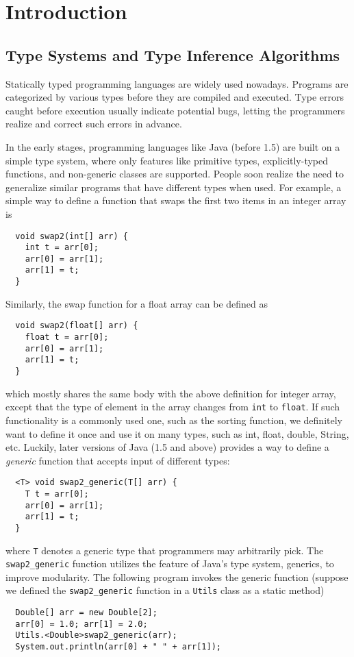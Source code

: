 \chapter{Introduction}


\section{Type Systems and Type Inference Algorithms}

Statically typed programming languages are widely used nowadays.
Programs are categorized by various types before they are compiled and executed.
Type errors caught before execution usually indicate potential bugs,
letting the programmers realize and correct such errors in advance.

In the early stages, programming languages like Java (before 1.5)
are built on a simple type system,
where only features like
primitive types, explicitly-typed functions,
and non-generic classes are supported.
People soon realize the need to generalize similar programs
that have different types when used.
For example, a simple way to define a function that swaps
the first two items in an integer array is
\begin{verbatim}
  void swap2(int[] arr) {
    int t = arr[0];
    arr[0] = arr[1];
    arr[1] = t;
  }
\end{verbatim}
Similarly, the swap function for a float array can be defined as
\begin{verbatim}
  void swap2(float[] arr) {
    float t = arr[0];
    arr[0] = arr[1];
    arr[1] = t;
  }
\end{verbatim}
which mostly shares the same body with the above definition for integer array,
except that the type of element in the array changes from \verb|int| to \verb|float|.
If such functionality is a commonly used one,
such as the sorting function,
we definitely want to define it once and use it on many types,
such as int, float, double, String, etc.
Luckily, later versions of Java (1.5 and above)
provides a way to define a \emph{generic} function that accepts input of different types:
\begin{verbatim}
  <T> void swap2_generic(T[] arr) {
    T t = arr[0];
    arr[0] = arr[1];
    arr[1] = t;
  }
\end{verbatim}
where \verb|T| denotes a generic type that programmers may arbitrarily pick.
The \verb|swap2_generic| function utilizes the feature of Java's type system, generics,
to improve modularity.
The following program invokes the generic function (suppose we defined
the \verb|swap2_generic| function in a \verb|Utils| class as a static method)
\begin{verbatim}
  Double[] arr = new Double[2];
  arr[0] = 1.0; arr[1] = 2.0;
  Utils.<Double>swap2_generic(arr);
  System.out.println(arr[0] + " " + arr[1]);
\end{verbatim}


